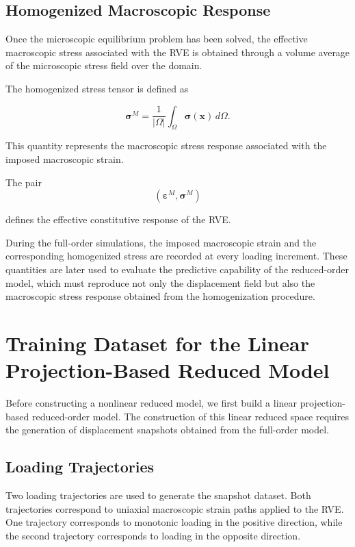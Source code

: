\documentclass[11pt,a4paper]{article}
\begin{document}
\subsection{Homogenized Macroscopic Response}

Once the microscopic equilibrium problem has been solved, the effective macroscopic stress associated with the RVE is obtained through a volume average of the microscopic stress field over the domain.

The homogenized stress tensor is defined as

\begin{equation}
\boldsymbol{\sigma}^{M}
=
\frac{1}{|\Omega|}
\int_{\Omega}
\boldsymbol{\sigma}(\mathbf{x})\, d\Omega .
\end{equation}

This quantity represents the macroscopic stress response associated with the imposed macroscopic strain.

The pair
\[
\left(
\boldsymbol{\varepsilon}^{M},
\boldsymbol{\sigma}^{M}
\right)
\]

defines the effective constitutive response of the RVE.

During the full-order simulations, the imposed macroscopic strain and the corresponding homogenized stress are recorded at every loading increment. These quantities are later used to evaluate the predictive capability of the reduced-order model, which must reproduce not only the displacement field but also the macroscopic stress response obtained from the homogenization procedure.

\section{Training Dataset for the Linear Projection-Based Reduced Model}

Before constructing a nonlinear reduced model, we first build a linear projection-based reduced-order model. The construction of this linear reduced space requires the generation of displacement snapshots obtained from the full-order model.

\subsection{Loading Trajectories}

Two loading trajectories are used to generate the snapshot dataset. Both trajectories correspond to uniaxial macroscopic strain paths applied to the RVE. One trajectory corresponds to monotonic loading in the positive direction, while the second trajectory corresponds to loading in the opposite direction.
\end{document}
